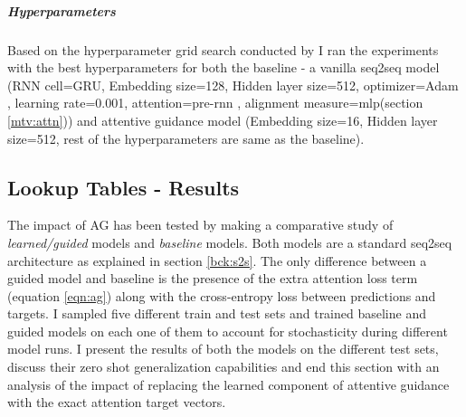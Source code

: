 \subparagraph{Hyperparameters} Based on the hyperparameter grid search conducted by \cite{Hupkes2018} I ran the experiments with the best hyperparameters for both the baseline - a vanilla seq2seq model (RNN cell=GRU, Embedding size=128, Hidden layer size=512, optimizer=Adam \citep{KingmaB14}, learning rate=0.001, attention=pre-rnn \citep{Bahdanau2014}, alignment measure=mlp(section \ref{mtv:attn})) and attentive guidance model (Embedding size=16, Hidden layer size=512, rest of the hyperparameters are same as the baseline).

\subsection{Lookup Tables - Results}
The impact of AG has been tested by making a comparative study of \textit{learned/guided} models and \textit{baseline} models. Both models are a standard seq2seq architecture as explained in section \ref{bck:s2s}. The only difference between a guided model and baseline is the presence of the extra attention loss term (equation \ref{eqn:ag}) along with the cross-entropy loss between predictions and targets. I sampled five different train and test sets and trained baseline and guided models on each one of them to account for stochasticity during different model runs. I present the results of both the models on the different test sets, discuss their zero shot generalization capabilities and end this section with an analysis of the impact of replacing the learned component of attentive guidance with the exact attention target vectors.

